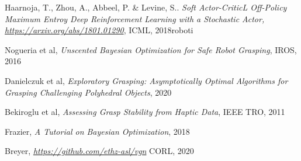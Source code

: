 \documentclass{article}
\begin{document}
\begin{thebibliography}{9}

    Haarnoja, T., Zhou, A., Abbeel, P. & Levine, S..
    \textit{Soft Actor-CriticL Off-Policy Maximum Entroy Deep Reinforcement Learning with a Stochastic Actor, \href{https://arxiv.org/abs/1801.01290}{https://arxiv.org/abs/1801.01290}},
    ICML,
    2018roboti

    Nogueria et al,
    \textit{Unscented Bayesian Optimization for Safe Robot Grasping},
    IROS,
    2016

    Danielczuk et al,
    \textit{Exploratory Grasping: Asymptotically Optimal Algorithms for Grasping Challenging Polyhedral Objects},
    2020

    Bekiroglu et al,
    \textit{Assessing Grasp Stability from Haptic Data},
    IEEE TRO,
    2011

    Frazier,
    \textit{A Tutorial on Bayesian Optimization},
    2018

    Breyer,
    \textit{\href{https://github.com/ethz-asl/vgn}{https://github.com/ethz-asl/vgn}}
    CORL,
    2020
    
\end{thebibliography}
\end{document}
